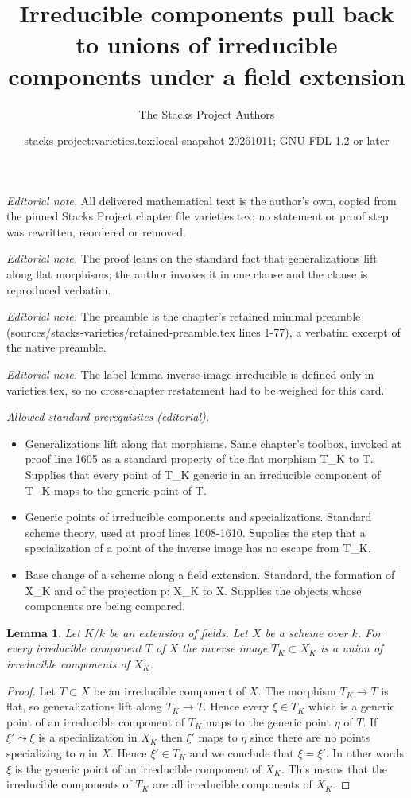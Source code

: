 \documentclass[10pt,a4paper]{amsart}
\title{Irreducible components pull back to unions of irreducible components under a field extension}
\author{The Stacks Project Authors}
\date{stacks-project:varieties.tex:local-snapshot-20261011; GNU FDL 1.2 or later}
\theoremstyle{plain}
\newtheorem{lemma}[subsection]{Lemma}
\theoremstyle{definition}
\theoremstyle{remark}
\numberwithin{equation}{subsection}
\begin{document}
\maketitle
\noindent\textit{Editorial note.} All delivered mathematical text is the author's own, copied from the pinned Stacks Project chapter file varieties.tex; no statement or proof step was rewritten, reordered or removed.\par\medskip
\noindent\textit{Editorial note.} The proof leans on the standard fact that generalizations lift along flat morphisms; the author invokes it in one clause and the clause is reproduced verbatim.\par\medskip
\noindent\textit{Editorial note.} The preamble is the chapter's retained minimal preamble (sources/stacks-varieties/retained-preamble.tex lines 1-77), a verbatim excerpt of the native preamble.\par\medskip
\noindent\textit{Editorial note.} The label lemma-inverse-image-irreducible is defined only in varieties.tex, so no cross-chapter restatement had to be weighed for this card.\par\medskip
\noindent\textit{Allowed standard prerequisites (editorial).}\begin{itemize}
\item Generalizations lift along flat morphisms. Same chapter's toolbox, invoked at proof line 1605 as a standard property of the flat morphism T\_K to T. Supplies that every point of T\_K generic in an irreducible component of T\_K maps to the generic point of T.
\item Generic points of irreducible components and specializations. Standard scheme theory, used at proof lines 1608-1610. Supplies the step that a specialization of a point of the inverse image has no escape from T\_K.
\item Base change of a scheme along a field extension. Standard, the formation of X\_K and of the projection p: X\_K to X. Supplies the objects whose components are being compared.
\end{itemize}\medskip
\begin{lemma}
\label{lemma-inverse-image-irreducible}
Let $K/k$ be an extension of fields.
Let $X$ be a scheme over $k$.
For every irreducible component $T$ of $X$ the inverse image
$T_K \subset X_K$ is a union of irreducible components of $X_K$.
\end{lemma}

\begin{proof}
Let $T \subset X$ be an irreducible component of $X$.
The morphism $T_K \to T$ is flat, so generalizations lift
along $T_K \to T$. Hence every $\xi \in T_K$
which is a generic point of an irreducible component of $T_K$
maps to the generic point $\eta$ of $T$. If $\xi' \leadsto \xi$ is
a specialization in $X_K$ then $\xi'$ maps to $\eta$ since there
are no points specializing to $\eta$ in $X$. Hence $\xi' \in T_K$
and we conclude that $\xi = \xi'$. In other words $\xi$ is the
generic point of an irreducible component of $X_K$. This
means that the irreducible components of $T_K$ are all irreducible
components of $X_K$.
\end{proof}
\end{document}
